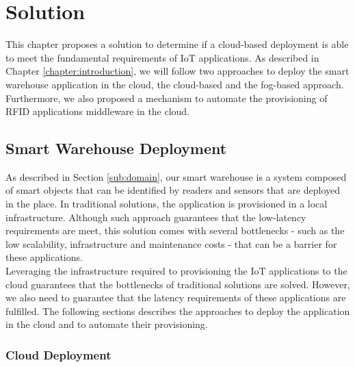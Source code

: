 
\chapter{Solution}
\label{chapter:solution}
This chapter proposes a solution to determine if a cloud-based deployment is able to meet the
fundamental requirements of \gls{IoT} applications. As described in Chapter \ref{chapter:introduction},
we will follow two approaches to deploy the smart warehouse application in the cloud, the cloud-based
and the fog-based approach. Furthermore, we also proposed a mechanism to automate the provisioning of
RFID applications middleware in the cloud.

\section{Smart Warehouse Deployment}
\label{sec:smart_warehouse_deployment}
As described in Section \ref{sub:domain}, our smart warehouse is a system composed of smart objects
that can be identified by readers and sensors that are deployed in the place. In traditional solutions,
the application is provisioned in a local infrastructure. Although such approach guarantees that
the low-latency requirements are meet, this solution comes with several bottlenecks - such as the
low scalability, infrastructure and maintenance costs - that can be a barrier for these applications.\\

Leveraging the infrastructure required to provisioning the \gls{IoT} applications to the cloud
guarantees that the bottlenecks of traditional solutions are solved. However, we also need
to guarantee that the latency requirements of these applications are fulfilled. The following sections
describes the approaches to deploy the application in the cloud and to automate their provisioning.

\subsection{Cloud Deployment}
\label{sub:sol_cloud}

